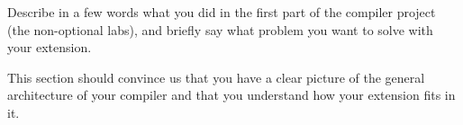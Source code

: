 Describe in a few words what you did in the first part of the compiler project
(the non-optional labs), and briefly say what problem you want to solve with
your extension.

This section should convince us that you have a clear picture of the general
architecture of your compiler and that you understand how your extension fits
in it.
